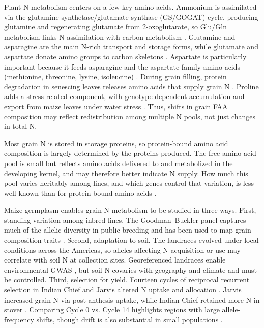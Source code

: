 \documentclass[namedate,unnumsec,webpdf,contemporary,large]{oup-authoring-template}
\begin{document}
Plant N metabolism centers on a few key amino acids. Ammonium is assimilated via the glutamine synthetase/glutamate synthase (GS/GOGAT) cycle, producing glutamine and regenerating glutamate from 2-oxoglutarate, so Glu/Gln metabolism links N assimilation with carbon metabolism \citep{MasclauxDaubresse2010NUE,Hodges2002TwoOxoglutarate}. Glutamine and asparagine are the main N-rich transport and storage forms, while glutamate and aspartate donate amino groups to carbon skeletons \citep{Bernard2009CytosolicGS,MasclauxDaubresse2010NUE}. Aspartate is particularly important because it feeds asparagine and the aspartate-family amino acids (methionine, threonine, lysine, isoleucine) \citep{Viola2001AspartatePathway, Wang2018AspSeeds, Han2021Aspartate}. During grain filling, protein degradation in senescing leaves releases amino acids that supply grain N \citep{Have2017NRemobilization, Liu2008ProteinDegradationNRemobilization}. Proline adds a stress-related component, with genotype-dependent accumulation and export from maize leaves under water stress \citep{Carceller1999ProlineRemobilization}. Thus, shifts in grain FAA composition may reflect redistribution among multiple N pools, not just changes in total N.

Most grain N is stored in storage proteins, so protein-bound amino acid composition is largely determined by the proteins produced. The free amino acid pool is small but reflects amino acids delivered to and metabolized in the developing kernel, and may therefore better indicate N supply. How much this pool varies heritably among lines, and which genes control that variation, is less well known than for protein-bound amino acids \citep{Shrestha2022}.

Maize germplasm enables grain N metabolism to be studied in three ways. First, standing variation among inbred lines. The Goodman--Buckler panel captures much of the allelic diversity in public breeding and has been used to map grain composition traits \citep{FlintGarcia2005Goodman,Shrestha2022}. Second, adaptation to soil. The landraces evolved under local conditions across the Americas, so alleles affecting N acquisition or use may correlate with soil N at collection sites. Georeferenced landraces enable environmental GWAS \citep{RomeroNavarro2017Landraces}, but soil N covaries with geography and climate and must be controlled. Third, selection for yield. Fourteen cycles of reciprocal recurrent selection in Indian Chief and Jarvis altered N uptake and allocation \citep{Comstock1949RRS,MollStuber1971,Moll1994}. Jarvis increased grain N via post-anthesis uptake, while Indian Chief retained more N in stover \citep{Moll1994}. Comparing Cycle 0 vs. Cycle 14 highlights regions with large allele-frequency shifts, though drift is also substantial in small populations \citep{Gerke2015DriftRRS}.
\end{document}
